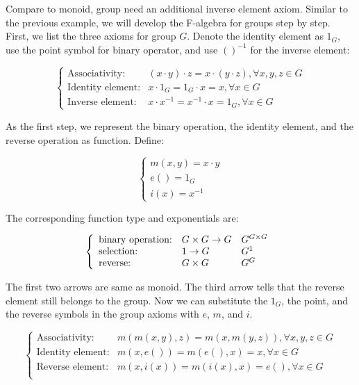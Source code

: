 \documentclass{article}
\begin{document}
\begin{example}
\normalfont
Compare to monoid, group need an additional inverse element axiom. Similar to the previous example, we will develop the F-algebra for groups step by step. First, we list the three axioms for group $G$. Denote the identity element as $1_G$, use the point symbol for binary operator, and use $()^{-1}$ for the inverse element:

\[
\begin{cases}
\text{Associativity:} & (x \cdot y) \cdot z = x \cdot (y \cdot z), \forall x, y, z \in G \\
\text{Identity element:} & x \cdot 1_G = 1_G \cdot x = x, \forall x \in G \\
\text{Inverse element:} & x \cdot x^{-1} = x^{-1} \cdot x = 1_G, \forall x \in G
\end{cases}
\]

As the first step, we represent the binary operation, the identity element, and the reverse operation as function. Define:

\[
\begin{cases}
m (x, y) = x \cdot y \\
e () = 1_G \\
i (x) = x^{-1}
\end{cases}
\]

The corresponding function type and exponentials are:

\[
  \left \{
    \begin{array}{lll}
      \text{binary operation:} & G \times G \to G & G^{G \times G}\\
      \text{selection:} & 1 \to G & G^1 \\
      \text{reverse:} & G \times G & G^G \\
    \end{array}
  \right . \\
\]

The first two arrows are same as monoid. The third arrow tells that the reverse element still belongs to the group. Now we can substitute the $1_G$, the point, and the reverse symbols in the group axioms with $e$, $m$, and $i$.

\[
\begin{cases}
\text{Associativity:} & m(m(x, y), z) = m(x, m(y, z)), \forall x, y, z \in G \\
\text{Identity element:} & m(x, e()) = m(e(), x) = x, \forall x \in G \\
\text{Reverse element:} & m(x, i(x)) = m(i(x), x) = e(), \forall x \in G \\
\end{cases}
\]


\end{example}
\end{document}
